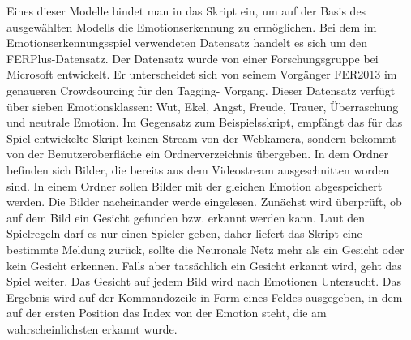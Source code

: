 \documentclass[10pt,a4paper]{report}
\begin{document}
Eines dieser Modelle  bindet man in das Skript ein, um auf der Basis des ausgewählten Modells die Emotionserkennung zu ermöglichen. Bei dem im Emotionserkennungsspiel verwendeten Datensatz 
handelt es sich um den FERPlus-Datensatz. 
 \cite{LeweOhlsen} Der Datensatz wurde
von einer Forschungsgruppe bei Microsoft entwickelt. Er unterscheidet sich
von seinem Vorgänger FER2013 im genaueren Crowdsourcing für den Tagging-
Vorgang.
 \cite{RamakrishnanPandeyKarmakarSaha} 
Dieser Datensatz verfügt über sieben Emotionsklassen: Wut, Ekel,
Angst, Freude, Trauer, Überraschung und neutrale Emotion.\newline
Im Gegensatz zum Beispielsskript, empfängt das für das Spiel entwickelte Skript 
keinen Stream von der Webkamera, sondern bekommt von der Benutzeroberfläche
ein Ordnerverzeichnis übergeben. In dem Ordner befinden sich Bilder, die bereits
aus dem Videostream ausgeschnitten worden sind. 
In einem Ordner sollen Bilder mit der gleichen Emotion abgespeichert werden. Die Bilder nacheinander werde
eingelesen.
 \newpage 
Zunächst wird überprüft, ob auf dem Bild ein Gesicht gefunden bzw.
erkannt werden kann. Laut den Spielregeln darf es nur einen Spieler geben,
daher liefert das Skript eine bestimmte Meldung zurück, sollte die Neuronale Netz mehr als ein Gesicht oder kein
Gesicht erkennen. Falls aber
tatsächlich ein Gesicht erkannt wird, geht das Spiel weiter. Das Gesicht auf
jedem Bild wird nach Emotionen Untersucht. Das Ergebnis wird auf der Kommandozeile
in Form eines Feldes ausgegeben, in dem auf der ersten Position das
Index von der Emotion steht, die am wahrscheinlichsten erkannt wurde.








%
\end{document}

